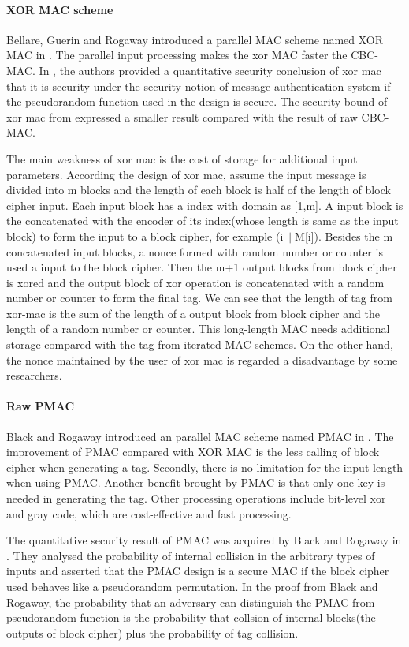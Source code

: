 \documentclass{article}
\begin{document}
\paragraph{XOR MAC scheme}
Bellare, Guerin and Rogaway introduced a parallel MAC scheme named XOR MAC in \cite{xor-mac}. 
The parallel input processing makes the xor MAC faster the CBC-MAC. 
In \cite{xor-mac}, the authors provided a quantitative security conclusion of xor mac that it is security under the security notion of message authentication system if the pseudorandom function used in the design is secure. The security bound of xor mac from \cite{xor-mac} expressed a smaller result compared with the result of raw CBC-MAC. 

The main weakness of xor mac is the cost of storage for additional input parameters. According the design of xor mac, assume the input message is divided into m blocks and the length of each block is half of the length of block cipher input. Each input block has a index with domain as [1,m]. A input block is the concatenated with the encoder of its index(whose length is same as the input block) to form the input to a block cipher, for example (i$\|$M[i]). Besides the m concatenated input blocks, a nonce formed with random number or counter is used a input to the block cipher. Then the m+1 output blocks from block cipher is xored and the output block of xor operation is concatenated with a random number or counter to form the final tag. 
We can see that the length of tag from xor-mac is the sum of the length of a output block from block cipher and the length of a random number or counter. This long-length MAC needs additional storage compared with the tag from iterated MAC schemes. 
On the other hand, the nonce maintained by the user of xor mac is regarded a disadvantage by some researchers.

\paragraph{Raw PMAC}
Black and Rogaway introduced an parallel MAC scheme named PMAC in \cite{pmac}. 
The improvement of PMAC compared with XOR MAC is the less calling of block cipher when generating a tag. Secondly, there is no limitation for the input length when using PMAC. 
Another benefit brought by PMAC is that only one key is needed in generating the tag. Other processing operations include bit-level xor and gray code, which are cost-effective and fast processing. 

The quantitative security result of PMAC was acquired by Black and Rogaway in \cite{pmac}. They analysed the probability of internal collision in the arbitrary types of inputs and asserted that the PMAC design is a secure MAC if the block cipher used behaves like a pseudorandom permutation. In the proof from Black and Rogaway, the probability that an adversary can distinguish the PMAC from pseudorandom function is the probability that collsion of internal blocks(the outputs of block cipher) plus the probability of tag collision. 
\end{document}
